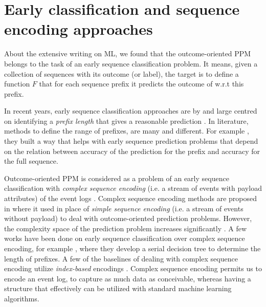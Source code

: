 \section{Early classification and sequence encoding approaches}
About the extensive writing on ML, we found that the outcome-oriented PPM belongs to the task of an early sequence classification problem. It means, given a collection of sequences with its outcome (or label), the target is to define a function $F$ that for each sequence prefix it predicts the outcome of w.r.t this prefix. 

In recent years, early sequence classification approaches are by and large centred on identifying a \textit{prefix length} that gives a reasonable prediction \cite{xing2012early}.  In literature, methods to define the range of prefixes, are many and different. For example \cite{mori2017reliable}, they built a way that helps with early sequence prediction problems that depend on the relation between accuracy of the prediction for the prefix and accuracy for the full sequence.  

Outcome-oriented PPM is considered as a problem of an early sequence classification with \textit{complex sequence encoding} (i.e. a stream of events with payload attributes) of the event logs \cite{santos2016literature, xing2010brief}.  Complex sequence encoding methods are proposed in \cite{leontjeva2016complex} where it used in place of \textit{simple sequence encoding} (i.e. a stream of events without payload) to deal with outcome-oriented prediction problems. However, the complexity space of the prediction problem increases significantly \cite{di2017eye}. A few works have been done on early sequence classification over complex sequence encoding, for example \cite{lin2015reliable}, where they develop a serial decision tree to determine the length of prefixes. A few of the baselines of dealing with complex sequence encoding utilize \textit{index-based} encodings \cite{leontjeva2016complex}.  Complex sequence encoding permits us to encode an event log, to capture as much data as conceivable, whereas having a structure that effectively can be utilized with standard machine learning algorithms.



